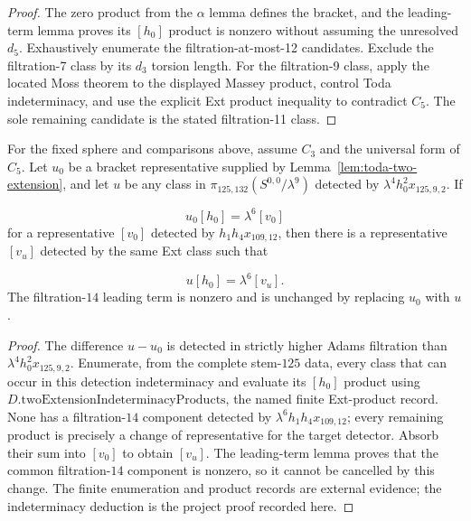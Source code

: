 \begin{proof}
  The zero product from the $\alpha$ lemma defines the bracket, and the
  leading-term lemma proves its $[h_0]$ product is nonzero without assuming the
  unresolved $d_5$.  Exhaustively enumerate the filtration-at-most-12
  candidates.  Exclude the filtration-7 class by its $d_3$ torsion length.
  For the filtration-9 class, apply the located Moss theorem to the displayed
  Massey product, control Toda indeterminacy, and use the explicit Ext product
  inequality to contradict $C_5$.  The sole remaining candidate is the stated
  filtration-11 class.
\end{proof}

\begin{lemma}
  \label{lem:near126-two-extension-indeterminacy}
  \notready
  For the fixed sphere and comparisons above, assume $C_3$ and the universal form
  of $C_5$.  Let $u_0$ be a bracket
  representative supplied by Lemma~\ref{lem:toda-two-extension}, and let $u$
  be any class in $\pi_{125,132}(S^{0,0}/\lambda^9)$ detected by
  $\lambda^4h_0^2x_{125,9,2}$.  If

  \[
    u_0[h_0]=\lambda^6[v_0]
  \]
  for a representative $[v_0]$ detected by $h_1h_4x_{109,12}$, then there is
  a representative $[v_u]$ detected by the same Ext class such that

  \[
    u[h_0]=\lambda^6[v_u].
  \]
  The filtration-$14$ leading term is nonzero and is unchanged by replacing
  $u_0$ with $u$.
\end{lemma}

\begin{proof}
  The difference $u-u_0$ is detected in strictly higher Adams filtration than
  $\lambda^4h_0^2x_{125,9,2}$.  Enumerate, from the complete stem-$125$ data,
  every class that can occur in this detection indeterminacy and evaluate its
  $[h_0]$ product using $D.\mathrm{twoExtensionIndeterminacyProducts}$, the
  named finite Ext-product record.  None has a
  filtration-$14$ component detected by
  $\lambda^6h_1h_4x_{109,12}$; every remaining product is precisely a change
  of representative for the target detector.  Absorb their sum into $[v_0]$
  to obtain $[v_u]$.  The leading-term lemma proves that the common
  filtration-$14$ component is nonzero, so it cannot be cancelled by this
  change.  The finite enumeration and product records are external evidence;
  the indeterminacy deduction is the project proof recorded here.
\end{proof}

